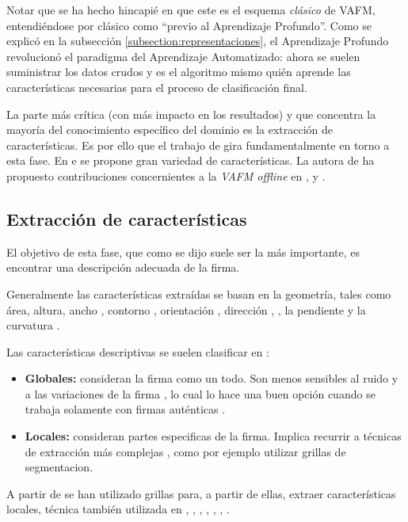 Notar que se ha hecho hincapié en que este es el esquema \textit{clásico} de VAFM, entendiéndose por clásico como ``previo al Aprendizaje Profundo''. Como se explicó en la subsección \ref{subsection:representaciones}, el Aprendizaje Profundo revolucionó el paradigma del Aprendizaje Automatizado: ahora se suelen suministrar los datos crudos y es el algoritmo mismo quién aprende las características necesarias para el proceso de clasificación final.

La parte más crítica (con más impacto en los resultados) y que concentra la mayoría del conocimiento específico del dominio es la extracción de características. Es por ello que el trabajo de \cite{tesis-parodi} gira fundamentalmente en torno a esta fase.  En \cite{ip08} e \cite{ipp12} se propone gran variedad de características. La autora de \cite{tesis-parodi} ha propuesto contribuciones concernientes a la \textit{VAFM offline} en \cite{pg10a}, \cite{pg10b} y \cite{pgb11}.

\subsection{Extracción de características}

El objetivo de esta fase, que como se dijo suele ser la más importante, es encontrar una descripción adecuada de la firma.

Generalmente las características extraídas se basan en la geometría, tales como área, altura, ancho \cite{ayf90} \cite{spb94}, contorno \cite{np94}, orientación \cite{spb94}, dirección \cite{sd92}, \cite{dsg94} \cite{zna05}, la pendiente \cite{ayf90} y la curvatura \cite{jgc02} \cite{ksx04}. 

Las características descriptivas se suelen clasificar en \cite{tesis-parodi}:
\begin{itemize}
    \item \textbf{Globales:} consideran la firma como un todo. Son menos sensibles al ruido y a las variaciones de la firma \cite{hyw04}, lo cual lo hace una buen opción cuando se trabaja solamente con firmas auténticas \cite{tesis-parodi}.
    \item \textbf{Locales:} consideran partes especificas de la firma. Implica recurrir a técnicas de extracción más complejas \cite{mld11}, como por ejemplo utilizar grillas de segmentacion.
\end{itemize}

A partir de \cite{nr77} se han utilizado grillas para, a partir de ellas, extraer características locales, técnica también utilizada en \cite{sp86}, \cite{js01}, \cite{jybs00}, \cite{sjbs04}, \cite{jbs05}, \cite{ojfs05}, \cite{bzze13}.  

